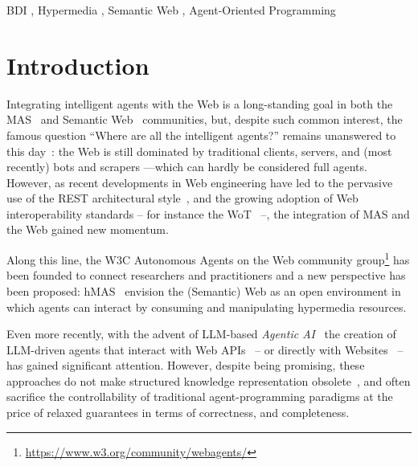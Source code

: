 \documentclass[
]{ceurart}
\begin{document}
\begin{keywords}
  BDI  \sep
  Hypermedia \sep
  Semantic Web \sep
  Agent-Oriented Programming
\end{keywords}

\maketitle

\section{Introduction}

Integrating intelligent agents with the Web is a long-standing goal
in both the \ac{MAS}~\cite{DBLP:conf/edoc/ShafiqDF06}
and Semantic Web~\cite{lassila2001semantic} communities, but,
despite such common interest,
the famous question
``Where are all the intelligent agents?''
remains unanswered to this day~\cite{hendlerb2007expert}:
the Web is still dominated by traditional clients, servers,
and (most recently) bots and scrapers%
---which can hardly be considered full agents.
%
However,
as recent developments in Web engineering have led to
the pervasive use of the \ac{REST} architectural style~\cite{DBLP:journals/toit/FieldingT02},
and the growing adoption of Web interoperability standards %
-- for instance the \ac{WoT}~\cite{wotarch} --,
the integration of \ac{MAS} and the Web gained new momentum.

Along this line,
the \ac{W3C} Autonomous Agents on the Web community group\footnote{\url{https://www.w3.org/community/webagents/}}
has been founded to connect researchers and practitioners
and a new perspective has been proposed: \ac{hMAS}~\cite{DBLP:conf/atal/CiorteaMGBRZ19}
envision the (Semantic) Web as an open environment in which
agents can interact by consuming and manipulating hypermedia resources.

Even more recently,
with the advent of \ac{LLM}-based \emph{Agentic AI}~\cite{acharya2025access}
the creation of \ac{LLM}-driven agents that interact with Web APIs~\cite{10.5555/3692070.3692540}
-- or directly with Websites~\cite{10.5555/3692070.3694608} --
has gained significant attention.
%
However,
despite being promising,
these approaches
do not make structured knowledge representation obsolete~\cite{pan2024tkde},
and often sacrifice the controllability of traditional agent-programming paradigms
at the price of relaxed guarantees in terms of correctness, and completeness.
\end{document}
